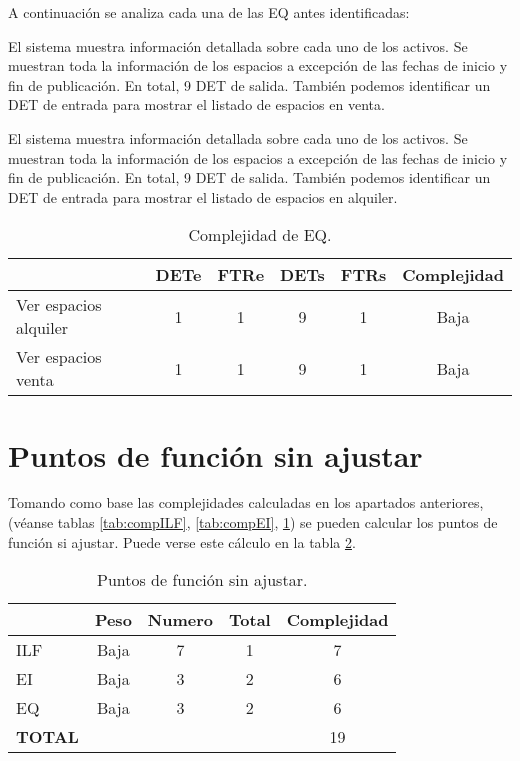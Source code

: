 \par A continuación se analiza cada una de las EQ antes identificadas:
\begin{description}[style=multiline, leftmargin=3cm]
    \item[Ver el listado de espacios en alquiler] El sistema muestra información detallada sobre cada uno de los activos. Se muestran toda la información de los espacios a excepción de las fechas de inicio y fin de publicación. En total, 9 DET de salida. También podemos identificar un DET de entrada para mostrar el listado de espacios en venta.
    \item[Ver el listado de espacios en venta] El sistema muestra información detallada sobre cada uno de los activos. Se muestran toda la información de los espacios a excepción de las fechas de inicio y fin de publicación. En total, 9 DET de salida. También podemos identificar un DET de entrada para mostrar el listado de espacios en alquiler.
\end{description}

\begin{table}[h]
\begin{center}
\begin{tabular}{ l c c c c c }
& \textbf{DETe} & \textbf{FTRe} & \textbf{DETs} & \textbf{FTRs} & \textbf{Complejidad} \\ \hline
Ver espacios alquiler & 1 & 1 & 9 & 1 & Baja\\
Ver espacios venta & 1 & 1 & 9 & 1  & Baja\\ \hline
\end{tabular}
\caption{Complejidad de EQ.}
\label{tab:compEQ}
\end{center}
\end{table}


\section{Puntos de función sin ajustar}
\par Tomando como base las complejidades calculadas en los apartados anteriores, (véanse tablas \ref{tab:compILF}, \ref{tab:compEI}, \ref{tab:compEQ}) se pueden calcular los puntos de función si ajustar. Puede verse este cálculo en la tabla \ref{tab:ptoFuncSA}.

\begin{table}[h]
\begin{center}
\begin{tabular}{ l c c c c }
& \textbf{Peso} & \textbf{Numero} & \textbf{Total} & \textbf{Complejidad} \\ \hline
ILF & Baja & 7 & 1 & 7 \\
EI & Baja & 3 & 2 & 6 \\
EQ & Baja & 3 & 2 & 6 \\ \hline
\textbf{TOTAL} & & & & 19 \\ \hline
\end{tabular}
\caption{Puntos de función sin ajustar.}
\label{tab:ptoFuncSA}
\end{center}
\end{table}

